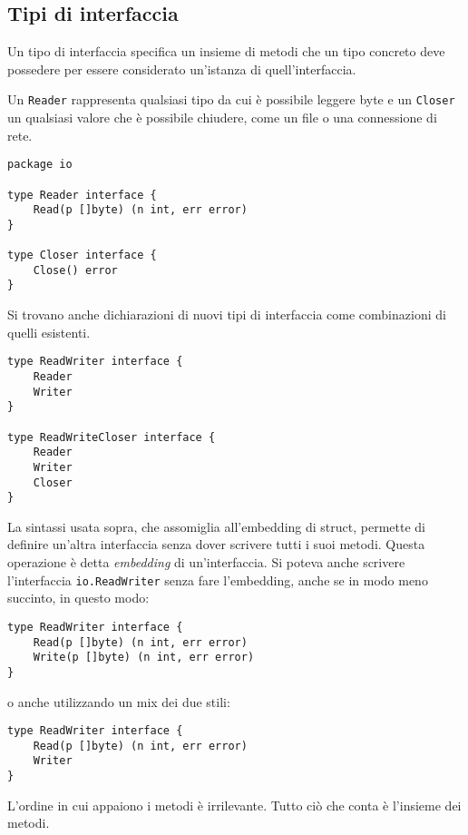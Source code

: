\documentclass[../../thesis.tex]{subfiles}
\begin{document}
    \subsection{Tipi di interfaccia}\label{subsec:tipi-di-interfaccia}
    Un tipo di interfaccia specifica un insieme di metodi che un tipo concreto deve possedere per essere considerato un'istanza di quell'interfaccia.
    \hfill \vspace{12pt}

    Un \verb"Reader" rappresenta qualsiasi tipo da cui è possibile leggere byte e un \verb"Closer" un qualsiasi valore che è possibile chiudere, come un file o una connessione di rete.
    \begin{lstlisting}[frame = single,label={lst:lstlisting6-2.1}]
package io

type Reader interface {
    Read(p []byte) (n int, err error)
}

type Closer interface {
    Close() error
}
    \end{lstlisting}
    Si trovano anche dichiarazioni di nuovi tipi di interfaccia come combinazioni di quelli esistenti.
    \begin{lstlisting}[frame = single,label={lst:lstlisting6-2.2}]
type ReadWriter interface {
    Reader
    Writer
}

type ReadWriteCloser interface {
    Reader
    Writer
    Closer
}
    \end{lstlisting}
    La sintassi usata sopra, che assomiglia all'embedding di struct, permette di definire un'altra interfaccia senza dover scrivere tutti i suoi metodi.
    Questa operazione è detta \textit{embedding} di un'interfaccia.
    Si poteva anche scrivere l'interfaccia \verb"io.ReadWriter" senza fare l'embedding, anche se in modo meno succinto, in questo modo:
    \begin{lstlisting}[frame = single,label={lst:lstlisting6-2.3}]
type ReadWriter interface {
    Read(p []byte) (n int, err error)
    Write(p []byte) (n int, err error)
}
    \end{lstlisting}
    o anche utilizzando un mix dei due stili:
    \begin{lstlisting}[frame = single,label={lst:lstlisting6-2.4}]
type ReadWriter interface {
    Read(p []byte) (n int, err error)
    Writer
}
    \end{lstlisting}
    L'ordine in cui appaiono i metodi è irrilevante.
    Tutto ciò che conta è l'insieme dei metodi.
\end{document}
